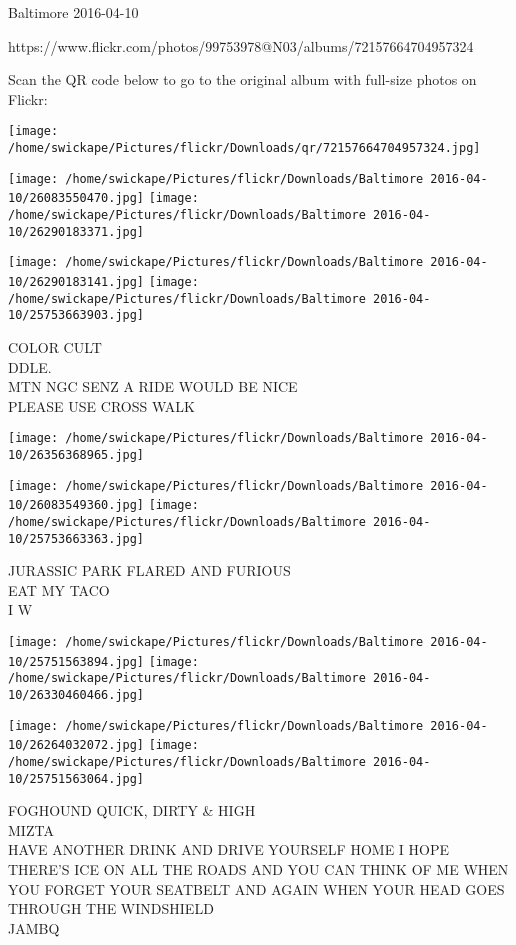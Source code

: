 \documentclass[10pt,letterpaper]{article}
\begin{document}
Baltimore 2016-04-10

https://www.flickr.com/photos/99753978@N03/albums/72157664704957324

Scan the QR code below to go to the original album with full-size photos on Flickr:

\texttt{[image: /home/swickape/Pictures/flickr/Downloads/qr/72157664704957324.jpg]}
\pagebreak

\texttt{[image: /home/swickape/Pictures/flickr/Downloads/Baltimore 2016-04-10/26083550470.jpg]}
\texttt{[image: /home/swickape/Pictures/flickr/Downloads/Baltimore 2016-04-10/26290183371.jpg]}

\texttt{[image: /home/swickape/Pictures/flickr/Downloads/Baltimore 2016-04-10/26290183141.jpg]}
\texttt{[image: /home/swickape/Pictures/flickr/Downloads/Baltimore 2016-04-10/25753663903.jpg]}

COLOR CULT\\
DDLE.\\
MTN NGC SENZ A RIDE WOULD BE NICE\\
PLEASE USE CROSS WALK\\
\pagebreak

\texttt{[image: /home/swickape/Pictures/flickr/Downloads/Baltimore 2016-04-10/26356368965.jpg]}

\vspace{0.25in}
\texttt{[image: /home/swickape/Pictures/flickr/Downloads/Baltimore 2016-04-10/26083549360.jpg]}
\texttt{[image: /home/swickape/Pictures/flickr/Downloads/Baltimore 2016-04-10/25753663363.jpg]}

JURASSIC PARK FLARED AND FURIOUS\\
EAT MY TACO\\
I W\\
\pagebreak

\texttt{[image: /home/swickape/Pictures/flickr/Downloads/Baltimore 2016-04-10/25751563894.jpg]}
\texttt{[image: /home/swickape/Pictures/flickr/Downloads/Baltimore 2016-04-10/26330460466.jpg]}

\texttt{[image: /home/swickape/Pictures/flickr/Downloads/Baltimore 2016-04-10/26264032072.jpg]}
\texttt{[image: /home/swickape/Pictures/flickr/Downloads/Baltimore 2016-04-10/25751563064.jpg]}

FOGHOUND QUICK, DIRTY \& HIGH\\
MIZTA\\
HAVE ANOTHER DRINK AND DRIVE YOURSELF HOME I HOPE THERE'S ICE ON ALL THE ROADS AND YOU CAN THINK OF ME WHEN YOU FORGET YOUR SEATBELT AND AGAIN WHEN YOUR HEAD GOES THROUGH THE WINDSHIELD\\
JAMBQ\\
\pagebreak
\end{document}
